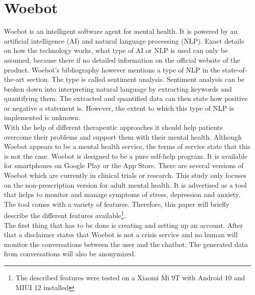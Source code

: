 \section{Woebot}
Woebot is an intelligent software agent for mental health.
It is powered by an artificial intelligence (AI) and natural language processing (NLP).
Exact details on how the technology works, what type of AI or NLP is used can only be assumed, because there if no detailed information on the official website of the product.
Woebot's bibliography however mentions a type of NLP in the state-of-the-art section\cite{ca-and-mental-health}.
The type is called sentiment analysis.
Sentiment analysis can be broken down into interpreting natural language by extracting keywords and quantifying them.
The extracted and quantified data can then state how positive or negative a statement is.
However, the extent to which this type of NLP is implemented is unknown.\\

With the help of different therapeutic approaches it should help patients overcome their problems and support them with their mental health.
Although Woebot appears to be a mental health service, the terms of service state that this is not the case\cite{woebot-tos}.
Woebot is designed to be a pure self-help program.
It is available for smartphones on Google Play or the App Store\cite{woebot-download}.
There are several versions of Woebot which are currently in clinical trials or research.
This study only focuses on the non-prescription version for adult mental health.
It is advertised as a tool that helps to monitor and manage symptoms of stress, depression and anxiety\cite{woebot-organizations}.
The tool comes with a variety of features.
Therefore, this paper will briefly describe the different features available\footnote{The described features were tested on a Xiaomi Mi 9T with Android 10 and MIUI 12 installed}. \\

The first thing that has to be done is creating and setting up an account.
After that a disclaimer states that Woebot is not a crisis service and no human will monitor the conversations between the user and the chatbot.
The generated data from conversations will also be anonymized. \\

